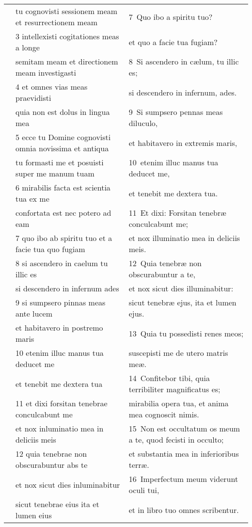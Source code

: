 \documentclass{article}
\begin{document}
\begin{longtable}{@{}p{}p{}p{}@{}}
	&	tu cognovisti sessionem meam et resurrectionem meam	&	7 Quo ibo a spiritu tuo?	\\
	&	3 intellexisti cogitationes meas a longe	&	et quo a facie tua fugiam?	\\
	&	semitam meam et directionem meam investigasti	&	8 Si ascendero in cælum, tu illic es;	\\
	&	4 et omnes vias meas praevidisti	&	si descendero in infernum, ades.	\\
	&	quia non est dolus in lingua mea	&	9 Si sumpsero pennas meas diluculo,	\\
	&	5 ecce tu Domine cognovisti omnia novissima et antiqua	&	et habitavero in extremis maris,	\\
	&	tu formasti me et posuisti super me manum tuam	&	10 etenim illuc manus tua deducet me,	\\
	&	6 mirabilis facta est scientia tua ex me	&	et tenebit me dextera tua.	\\
	&	confortata est nec potero ad eam	&	11 Et dixi: Forsitan tenebræ conculcabunt me;	\\
	&	7 quo ibo ab spiritu tuo et a facie tua quo fugiam	&	et nox illuminatio mea in deliciis meis.	\\
	&	8 si ascendero in caelum tu illic es	&	12 Quia tenebræ non obscurabuntur a te,	\\
	&	si descendero in infernum ades	&	et nox sicut dies illuminabitur:	\\
	&	9 si sumpsero pinnas meas ante lucem	&	sicut tenebræ ejus, ita et lumen ejus.	\\
	&	et habitavero in postremo maris	&	13 Quia tu possedisti renes meos;	\\
	&	10 etenim illuc manus tua deducet me	&	suscepisti me de utero matris meæ.	\\
	&	et tenebit me dextera tua	&	14 Confitebor tibi, quia terribiliter magnificatus es;	\\
	&	11 et dixi forsitan tenebrae conculcabunt me	&	mirabilia opera tua, et anima mea cognoscit nimis.	\\
	&	et nox inluminatio mea in deliciis meis	&	15 Non est occultatum os meum a te, quod fecisti in occulto;	\\
	&	12 quia tenebrae non obscurabuntur abs te	&	et substantia mea in inferioribus terræ.	\\
	&	et nox sicut dies inluminabitur	&	16 Imperfectum meum viderunt oculi tui,	\\
	&	sicut tenebrae eius ita et lumen eius	&	et in libro tuo omnes scribentur.	\\

\end{longtable}
\end{document}
